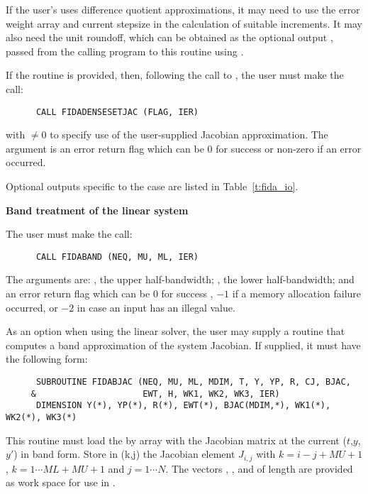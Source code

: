 \begin{Steps}
  If the user's  uses difference quotient approximations, it
  may need to use the error weight array  and current stepsize 
  in the calculation of suitable increments.  It may also need the unit
  roundoff, which can be obtained as the optional output ,
  passed from the calling program to this routine using .

  If the  routine is provided, then, 
  following the call to , the user must make the call:
\begin{verbatim}
      CALL FIDADENSESETJAC (FLAG, IER)
\end{verbatim}
  with  $\neq 0$ to specify use of the user-supplied Jacobian approximation.
  The argument  is an error return flag which can be $0$ 
  for success or non-zero if an error occurred.
  
  Optional outputs specific to the {\dense} case are listed in Table~\ref{t:fida_io}.

  {\s} {\bf Band treatment of the linear system}
  
  The user must make the call:
\begin{verbatim}
      CALL FIDABAND (NEQ, MU, ML, IER)
\end{verbatim}
  The arguments are: , the upper half-bandwidth; , 
  the lower half-bandwidth; and  an error return flag which can be  
  $0$ for success , $-1$ if a memory allocation failure occurred, or $-2$ 
  in case an input has an illegal value.     
  
  As an option when using the {\band} linear solver, the user may supply a
  routine that computes a band approximation of the system Jacobian. If supplied,
  it must have the following form:
\begin{verbatim}
      SUBROUTINE FIDABJAC (NEQ, MU, ML, MDIM, T, Y, YP, R, CJ, BJAC,
     &                     EWT, H, WK1, WK2, WK3, IER)
      DIMENSION Y(*), YP(*), R(*), EWT(*), BJAC(MDIM,*), WK1(*), WK2(*), WK3(*)
\end{verbatim}
  This routine must load the  by  array  with the Jacobian
  matrix at the current ($t$,$y$,$y'$) in band form.  Store in (k,j)
  the Jacobian element $J_{i,j}$ with $k = i - j + MU + 1$, $k = 1 \cdots ML+MU+1$
  and $j = 1 \cdots N$. The vectors , , and  of length
   are provided as work space for use in .


\end{Steps}
